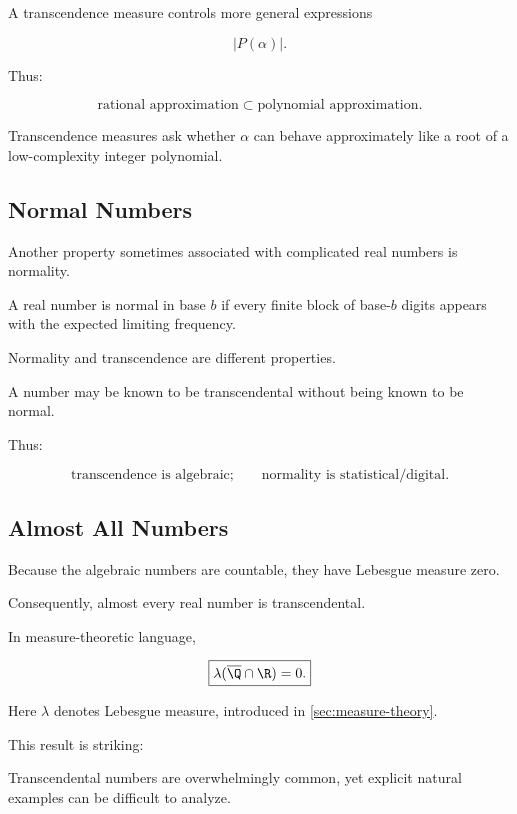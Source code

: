 A transcendence measure controls more general expressions

\[ |P(\alpha)|. \]

Thus:

\[
\boxed{
\text{rational approximation}
\subset
\text{polynomial approximation}.
}
\]

Transcendence measures ask whether \(\alpha\) can behave approximately like
a root of a low-complexity integer polynomial.

\subsection{Normal Numbers}
\label{subsec:normal-numbers-transcendence}

Another property sometimes associated with complicated real numbers is
normality.

A real number is normal in base \(b\) if every finite block of base-\(b\)
digits appears with the expected limiting frequency.

Normality and transcendence are different properties.

A number may be known to be transcendental without being known to be normal.

Thus:

\[
\boxed{
\text{transcendence is algebraic;}
\qquad
\text{normality is statistical/digital}.
}
\]

\subsection{Almost All Numbers}
\label{subsec:almost-all-transcendental}

Because the algebraic numbers are countable, they have Lebesgue measure
zero.

Consequently, almost every real number is transcendental.

In measure-theoretic language,

\[ \boxed{\lambda(\overline{\Q}\cap\R)=0.} \]

Here \(\lambda\) denotes Lebesgue measure, introduced in
\cref{sec:measure-theory}.

This result is striking:

\begin{center}
Transcendental numbers are overwhelmingly common, yet explicit natural
examples can be difficult to analyze.
\end{center}

